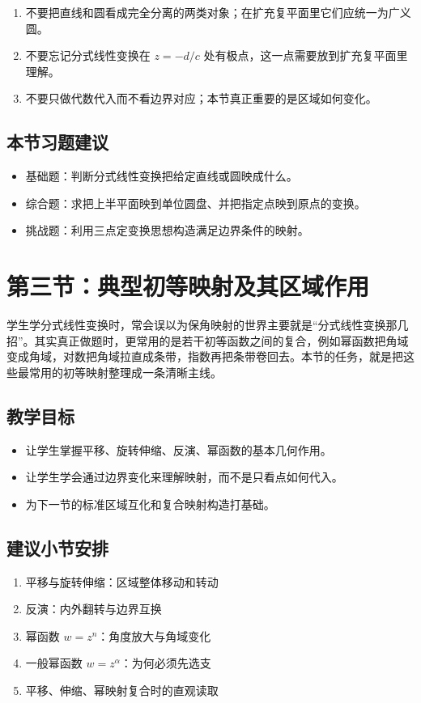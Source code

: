 \begin{jinshi}[本节易错点]
\begin{enumerate}
    \item 不要把直线和圆看成完全分离的两类对象；在扩充复平面里它们应统一为广义圆。
    \item 不要忘记分式线性变换在 $z=-d/c$ 处有极点，这一点需要放到扩充复平面里理解。
    \item 不要只做代数代入而不看边界对应；本节真正重要的是区域如何变化。
\end{enumerate}
\end{jinshi}

\subsection*{本节习题建议}
\begin{itemize}
    \item 基础题：判断分式线性变换把给定直线或圆映成什么。
    \item 综合题：求把上半平面映到单位圆盘、并把指定点映到原点的变换。
    \item 挑战题：利用三点定变换思想构造满足边界条件的映射。
\end{itemize}

\section{第三节：典型初等映射及其区域作用}

\begin{wulibj}[本节要解决的问题]
学生学分式线性变换时，常会误以为保角映射的世界主要就是``分式线性变换那几招''。其实真正做题时，更常用的是若干初等函数之间的复合，例如幂函数把角域变成角域，对数把角域拉直成条带，指数再把条带卷回去。本节的任务，就是把这些最常用的初等映射整理成一条清晰主线。
\end{wulibj}

\subsection*{教学目标}
\begin{itemize}
    \item 让学生掌握平移、旋转伸缩、反演、幂函数的基本几何作用。
    \item 让学生学会通过边界变化来理解映射，而不是只看点如何代入。
    \item 为下一节的标准区域互化和复合映射构造打基础。
\end{itemize}

\subsection*{建议小节安排}
\begin{enumerate}
    \item 平移与旋转伸缩：区域整体移动和转动
    \item 反演：内外翻转与边界互换
    \item 幂函数 $w=z^n$：角度放大与角域变化
    \item 一般幂函数 $w=z^\alpha$：为何必须先选支
    \item 平移、伸缩、幂映射复合时的直观读取
\end{enumerate}

